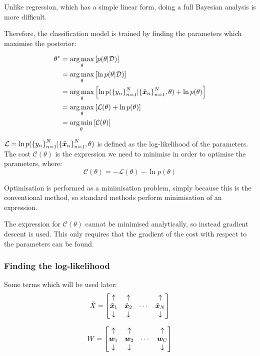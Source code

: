 \documentclass[../../main.tex]{subfiles}
\begin{document}
Unlike regression, which has a simple linear form, doing a full Bayesian analysis is more difficult.

Therefore, the classification model is trained by finding the parameters which maximise the posterior:

\begin{align*}
\theta^*
&= \operatorname*{arg\,max}_{\theta}\left[p(\theta | \mathcal{D}) \right] \\
&= \operatorname*{arg\,max}_{\theta}\left[\ln p(\theta | \mathcal{D}) \right] \\
&= \operatorname*{arg\,max}_{\theta}\left[\ln p({\{y_n\}}_{n=1}^N|{\{\tilde{\bm{x}}_n\}}_{n=1}^N, \theta) + \ln p(\theta) \right] \\
&= \operatorname*{arg\,max}_{\theta}\left[\mathcal{L}(\theta) + \ln p(\theta) \right] \\
&= \operatorname*{arg\,min}_{\theta}\left[\mathcal{C}(\theta)\right]
\end{align*}

$\mathcal{L} = \ln p({\{y_n\}}_{n=1}^N|{\{\tilde{\bm{x}}_n\}}_{n=1}^N, \theta)$ is defined as the log-likelihood of the parameters.
The cost $\mathcal{C}(\theta)$ is the expression we need to minimise in order to optimise the parameters, where:
\[ \mathcal{C}(\theta) = -\mathcal{L}(\theta) - \ln p(\theta)\]

Optimisation is performed as a minimisation problem, simply because this is the conventional method, so standard methods perform minimisation of an expression.

The expression for $\mathcal{C}(\theta)$ cannot be minimised analytically, so instead gradient descent is used.
This only requires that the gradient of the cost with respect to the parameters can be found.

\subsubsection{Finding the log-likelihood}

Some terms which will be used later:
\[ \tilde{X} = \left[\begin{matrix}
    \uparrow & \uparrow & & \uparrow \\
    \tilde{\bm{x}}_1 &
    \tilde{\bm{x}}_2 &
    \cdots &
    \tilde{\bm{x}}_N \\
    \downarrow & \downarrow & & \downarrow
\end{matrix}\right] \]

\[ W = \left[\begin{matrix}
    \uparrow & \uparrow & & \uparrow \\
    \bm{w}_1 &
    \bm{w}_2 &
    \cdots &
    \bm{w}_C \\
    \downarrow & \downarrow & & \downarrow
\end{matrix}\right] \]
\end{document}
